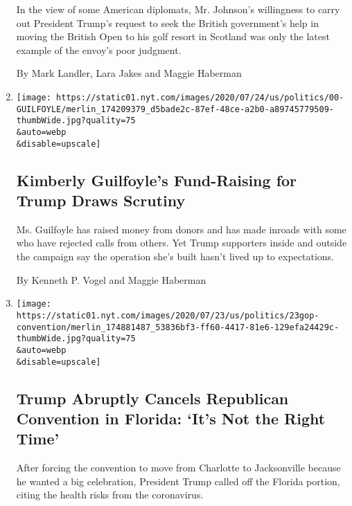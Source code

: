 \begin{enumerate}
  In the view of some American diplomats, Mr. Johnson's willingness to
  carry out President Trump's request to seek the British government's
  help in moving the British Open to his golf resort in Scotland was
  only the latest example of the envoy's poor judgment.

  By Mark Landler, Lara Jakes and Maggie Haberman
\item
  \href{/2020/07/24/us/politics/kimberly-guilfoyles-trump-fundraising.html}{}

  \texttt{[image: https://static01.nyt.com/images/2020/07/24/us/politics/00-GUILFOYLE/merlin\_174209379\_d5bade2c-87ef-48ce-a2b0-a89745779509-thumbWide.jpg?quality=75\\\&auto=webp\\\&disable=upscale]}

  \hypertarget{kimberly-guilfoyles-fund-raising-for-trump-draws-scrutiny}{%
  \subsection{Kimberly Guilfoyle's Fund-Raising for Trump Draws
  Scrutiny}\label{kimberly-guilfoyles-fund-raising-for-trump-draws-scrutiny}}

  Ms. Guilfoyle has raised money from donors and has made inroads with
  some who have rejected calls from others. Yet Trump supporters inside
  and outside the campaign say the operation she's built hasn't lived up
  to expectations.

  By Kenneth P. Vogel and Maggie Haberman
\item
  \href{/2020/07/23/us/politics/jacksonville-rnc.html}{}

  \texttt{[image: https://static01.nyt.com/images/2020/07/23/us/politics/23gop-convention/merlin\_174881487\_53836bf3-ff60-4417-81e6-129efa24429c-thumbWide.jpg?quality=75\\\&auto=webp\\\&disable=upscale]}

  \hypertarget{trump-abruptly-cancels-republican-convention-in-florida-its-not-the-right-time}{%
  \subsection{Trump Abruptly Cancels Republican Convention in Florida:
  `It's Not the Right
  Time'}\label{trump-abruptly-cancels-republican-convention-in-florida-its-not-the-right-time}}

  After forcing the convention to move from Charlotte to Jacksonville
  because he wanted a big celebration, President Trump called off the
  Florida portion, citing the health risks from the coronavirus.


\end{enumerate}
